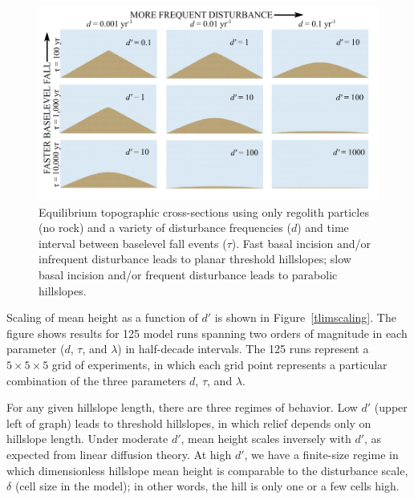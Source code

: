 \documentclass[esurf, manuscript]{copernicus}
\begin{document}
\begin{figure}[t]
\includegraphics{Figures/simple_hills_3x3.pdf}
\caption{Equilibrium topographic cross-sections using only regolith particles (no rock) and a variety of disturbance frequencies ($d$) and time interval between baselevel fall events ($\tau$). Fast basal incision and/or infrequent disturbance leads to planar threshold hillslopes; slow basal incision and/or frequent disturbance leads to parabolic hillslopes.}
\label{tlim}
\end{figure}

Scaling of mean height as a function of $d'$ is shown in Figure~\ref{tlimscaling}. The figure shows results for 125 model runs spanning two orders of magnitude in each parameter ($d$, $\tau$, and $\lambda$) in half-decade intervals. The 125 runs represent a $5\times 5\times 5$ grid of experiments, in which each grid point represents a particular combination of the three parameters $d$, $\tau$, and $\lambda$.

For any given hillslope length, there are three regimes of behavior. Low $d'$ (upper left of graph) leads to threshold hillslopes, in which relief depends only on hillslope length. Under moderate $d'$, mean height scales inversely with $d'$, as expected from linear diffusion theory. At high $d'$, we have a finite-size regime in which dimensionless hillslope mean height is comparable to the disturbance scale, $\delta$ (cell size in the model); in other words, the hill is only one or a few cells high.
\end{document}
